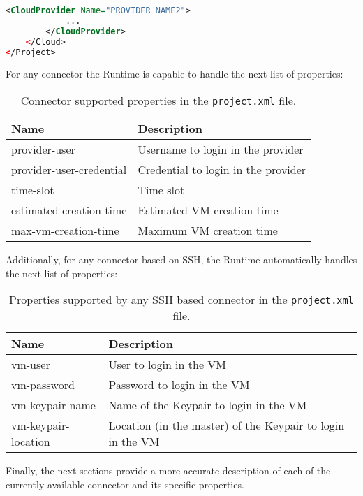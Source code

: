\begin{lstlisting}[language=xml]
        <CloudProvider Name="PROVIDER_NAME2">
            ...
        </CloudProvider>
    </Cloud>
</Project>
\end{lstlisting}

For any connector the Runtime is capable to handle the next list of properties:

\begin{table}[!ht]
\def\arraystretch{1.2}
\centering
\begin{tabularx}{\linewidth}{|l|X|} \hline
	\textbf{Name} &\textbf{Description} \\ \hline
	provider-user & Username to login in the provider\\ \hline
	provider-user-credential & Credential to login in the provider\\ \hline
	time-slot & Time slot\\ \hline
	estimated-creation-time & Estimated VM creation time\\ \hline
	max-vm-creation-time & Maximum VM creation time\\ \hline
\end{tabularx}
\caption{Connector supported properties in the \texttt{project.xml} file.}
\label{tab:abstract_connector_properties}
\end{table}

Additionally, for any connector based on SSH, the Runtime automatically handles the next list of properties:

\begin{table}[!ht]
\def\arraystretch{1.2}
\centering
\begin{tabularx}{\linewidth}{|l|X|} \hline
	\textbf{Name} &\textbf{Description} \\ \hline
	vm-user & User to login in the VM\\ \hline
	vm-password & Password to login in the VM\\ \hline
	vm-keypair-name & Name of the Keypair to login in the VM\\ \hline
	vm-keypair-location & Location (in the master) of the Keypair to login in the VM \\ \hline
\end{tabularx}
\caption{Properties supported by any SSH based connector in the \texttt{project.xml} file.}
\label{tab:ssh_connector_properties}
\end{table}

Finally, the next sections provide a more accurate description of each of the currently available connector and its specific properties.

